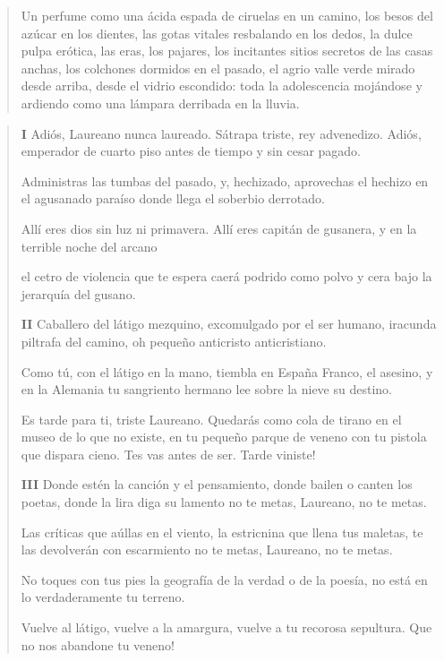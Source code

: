 \documentclass[12pt]{article}
\begin{document}
\clearpage
{}
\begin{verse}
Un perfume como una ácida espada  
de ciruelas en un camino,  
los besos del azúcar en los dientes,  
las gotas vitales resbalando en los dedos,  
la dulce pulpa erótica,  
las eras, los pajares, los incitantes  
sitios secretos de las casas anchas,  
los colchones dormidos en el pasado, el agrio valle verde  
mirado desde arriba, desde el vidrio escondido:  
toda la adolescencia mojándose y ardiendo  
como una lámpara derribada en la lluvia.  

\end{verse}

\clearpage
{}
\begin{verse}
\vspace{\baselineskip}
{\scshape\bfseries I}
Adiós, Laureano nunca laureado.  
Sátrapa triste, rey advenedizo.  
Adiós, emperador de cuarto piso  
antes de tiempo y sin cesar pagado.  
	
Administras las tumbas del pasado,  
y, hechizado, aprovechas el hechizo  
en el agusanado paraíso  
donde llega el soberbio derrotado.  
	
Allí eres dios sin luz ni primavera.  
Allí eres capitán de gusanera,  
y en la terrible noche del arcano  
	
el cetro de violencia que te espera  
caerá podrido como polvo y cera  
bajo la jerarquía del gusano.  

\vspace{\baselineskip}
{\scshape\bfseries II}
Caballero del látigo mezquino,  
excomulgado por el ser humano,  
iracunda piltrafa del camino,  
oh pequeño anticristo anticristiano.  
	
Como tú, con el látigo en la mano,  
tiembla en España Franco, el asesino,  
y en la Alemania tu sangriento hermano  
lee sobre la nieve su destino.  
	
Es tarde para ti, triste Laureano.  
Quedarás como cola de tirano  
en el museo de lo que no existe,  
en tu pequeño parque de veneno  
con tu pistola que dispara cieno.  
Tes vas antes de ser. Tarde viniste!  

\vspace{\baselineskip}
{\scshape\bfseries III}
Donde estén la canción y el pensamiento,  
donde bailen o canten los poetas,  
donde la lira diga su lamento  
no te metas, Laureano, no te metas.  
	
Las críticas que aúllas en el viento,  
la estricnina que llena tus maletas,  
te las devolverán con escarmiento  
no te metas, Laureano, no te metas.  
	
No toques con tus pies la geografía  
de la verdad o de la poesía,  
no está en lo verdaderamente tu terreno.  
	
Vuelve al látigo, vuelve a la amargura,  
vuelve a tu recorosa sepultura.  
Que no nos abandone tu veneno!  
\end{verse}
\end{document}
